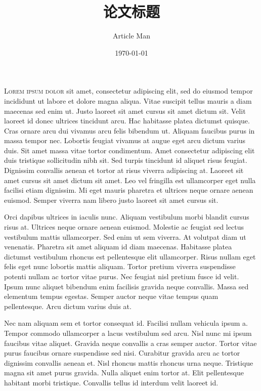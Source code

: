 \documentclass[a4paper,12pt,oneside]{article}
\title{论文标题}
\author{Article Man}
\date{\today}
\makeatletter
\newcommand{\subtitle}{A nice and simple subtitle to the article}
\def\maketitle{\noindent{
\vspace{0.25in}
    \begin{center}
        {\fontsize{30}{36}\selectfont\sffamily\AlegreyaSansExtraBold\MakeLowercase\@title}\\\vspace{1.2em}%
        {\textit{\subtitle}\vspace{1.5em}}\\%
        {\small{\@author\ |\ \@date}}\vspace{1.5em}%
    \end{center}
  }
}
\makeatother
\begin{document}
\maketitle

\lettrine[lines=3,nindent=0em]{L}{orem ipsum dolor} sit amet, consectetur adipiscing elit, sed do eiusmod tempor incididunt ut labore et dolore magna aliqua. Vitae suscipit tellus mauris a diam maecenas sed enim ut. Justo laoreet sit amet cursus sit amet dictum sit. Velit laoreet id donec ultrices tincidunt arcu. Hac habitasse platea dictumst quisque. Cras ornare arcu dui vivamus arcu felis bibendum ut. Aliquam faucibus purus in massa tempor nec. Lobortis feugiat vivamus at augue eget arcu dictum varius duis. Sit amet massa vitae tortor condimentum. Amet consectetur adipiscing elit duis tristique sollicitudin nibh sit. Sed turpis tincidunt id aliquet risus feugiat. Dignissim convallis aenean et tortor at risus viverra adipiscing at. Laoreet sit amet cursus sit amet dictum sit amet. Leo vel fringilla est ullamcorper eget nulla facilisi etiam dignissim. Mi eget mauris pharetra et ultrices neque ornare aenean euismod. Semper viverra nam libero justo laoreet sit amet cursus sit.

Orci dapibus ultrices in iaculis nunc. Aliquam vestibulum morbi blandit cursus risus at. Ultrices neque ornare aenean euismod. Molestie ac feugiat sed lectus vestibulum mattis ullamcorper. Sed enim ut sem viverra. At volutpat diam ut venenatis. Pharetra sit amet aliquam id diam maecenas. Habitasse platea dictumst vestibulum rhoncus est pellentesque elit ullamcorper. Risus nullam eget felis eget nunc lobortis mattis aliquam. Tortor pretium viverra suspendisse potenti nullam ac tortor vitae purus. Nec feugiat nisl pretium fusce id velit. Ipsum nunc aliquet bibendum enim facilisis gravida neque convallis. Massa sed elementum tempus egestas. Semper auctor neque vitae tempus quam pellentesque. Arcu dictum varius duis at.

Nec nam aliquam sem et tortor consequat id. Facilisi nullam vehicula ipsum a. Tempor commodo ullamcorper a lacus vestibulum sed arcu. Nisl nunc mi ipsum faucibus vitae aliquet. Gravida neque convallis a cras semper auctor. Tortor vitae purus faucibus ornare suspendisse sed nisi. Curabitur gravida arcu ac tortor dignissim convallis aenean et. Nisl rhoncus mattis rhoncus urna neque. Tristique magna sit amet purus gravida. Nulla aliquet enim tortor at. Elit pellentesque habitant morbi tristique. Convallis tellus id interdum velit laoreet id.
\end{document}
